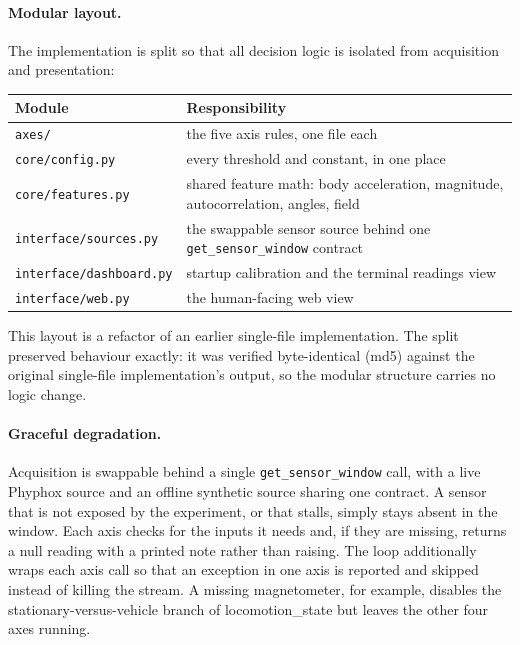 \documentclass[11pt]{article}
\newcommand{\nb}[1]{\texttt{#1}}            %
\newcommand{\axis}[1]{\textsf{#1}}          %
\begin{document}
\paragraph{Modular layout.}
The implementation is split so that all decision logic is isolated from acquisition and
presentation:

\begin{table}[ht]
\centering
\begin{tabular}{@{}l p{}@{}}
\toprule
Module & Responsibility \\
\midrule
\nb{axes/} & the five axis rules, one file each \\
\nb{core/config.py} & every threshold and constant, in one place \\
\nb{core/features.py} & shared feature math: body acceleration, magnitude, autocorrelation, angles, field \\
\nb{interface/sources.py} & the swappable sensor source behind one \nb{get\_sensor\_window} contract \\
\nb{interface/dashboard.py} & startup calibration and the terminal readings view \\
\nb{interface/web.py} & the human-facing web view \\
\bottomrule
\end{tabular}
\end{table}

This layout is a refactor of an earlier single-file implementation. The split preserved
behaviour exactly: it was verified byte-identical (md5) against the original single-file
implementation's output, so the modular structure carries no logic change.

\paragraph{Graceful degradation.}
Acquisition is swappable behind a single \nb{get\_sensor\_window} call, with a live
Phyphox source and an offline synthetic source sharing one contract. A sensor that is
not exposed by the experiment, or that stalls, simply stays absent in the window. Each
axis checks for the inputs it needs and, if they are missing, returns a null reading
with a printed note rather than raising. The loop additionally wraps each axis call so
that an exception in one axis is reported and skipped instead of killing the stream.
A missing magnetometer, for example, disables the stationary-versus-vehicle branch of
\axis{locomotion\_state} but leaves the other four axes running.
\end{document}
